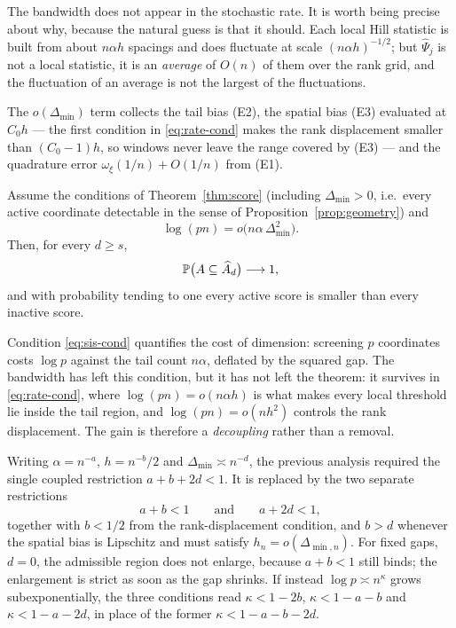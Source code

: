 The bandwidth does not appear in the stochastic rate. It is worth being
precise about why, because the natural guess is that it should. Each
local Hill statistic is built from about $n\alpha h$ spacings and does
fluctuate at scale $(n\alpha h)^{-1/2}$; but $\widehat\Psi_j$ is not a
local statistic, it is an \emph{average} of $O(n)$ of them over the rank
grid, and the fluctuation of an average is not the largest of the
fluctuations.

The $o(\Delta_{\min})$ term collects the tail bias (E2),
the spatial bias (E3) evaluated at $C_0h$ --- the first condition in
\eqref{eq:rate-cond} makes the rank displacement smaller than $(C_0-1)h$,
so windows never leave the range covered by (E3) --- and the quadrature
error $\omega_\xi(1/n)+O(1/n)$ from (E1).

\begin{theorem}\label{thm:sis}
Assume the conditions of Theorem~\ref{thm:score} (including
$\Delta_{\min}>0$, i.e.\ every active coordinate detectable in the
sense of Proposition~\ref{prop:geometry}) and
\begin{equation}\label{eq:sis-cond}
 \log(pn)=o\bigl(n\alpha\,\Delta_{\min}^2\bigr).
\end{equation}
Then, for every $d\ge s$,
\[
 \mathbb P\bigl(A\subseteq\widehat{A}_d\bigr)\longrightarrow1,
\]
and with probability tending to one every active score is smaller than
every inactive score.
\end{theorem}


Condition \eqref{eq:sis-cond} quantifies the cost of dimension:
screening $p$ coordinates costs $\log p$ against the tail count
$n\alpha$, deflated by the squared gap. The bandwidth has left this
condition, but it has not left the theorem: it survives in
\eqref{eq:rate-cond}, where $\log(pn)=o(n\alpha h)$ is what makes every
local threshold lie inside the tail region, and $\log(pn)=o(nh^2)$
controls the rank displacement. The gain is therefore a
\emph{decoupling} rather than a removal.

Writing $\alpha=n^{-a}$, $h=n^{-b}/2$ and $\Delta_{\min}\asymp n^{-d}$,
the previous analysis required the single coupled restriction
$a+b+2d<1$. It is replaced by the two separate restrictions
\[
 a+b<1
 \qquad\text{and}\qquad
 a+2d<1,
\]
together with $b<1/2$ from the rank-displacement condition, and $b>d$
whenever the spatial bias is Lipschitz and must satisfy
$h_n=o(\Delta_{\min,n})$. For fixed gaps, $d=0$, the admissible region
does not enlarge, because $a+b<1$ still binds; the enlargement is strict
as soon as the gap shrinks. If instead $\log p\asymp n^\kappa$ grows
subexponentially, the three conditions read $\kappa<1-2b$,
$\kappa<1-a-b$ and $\kappa<1-a-2d$, in place of the former
$\kappa<1-a-b-2d$.

